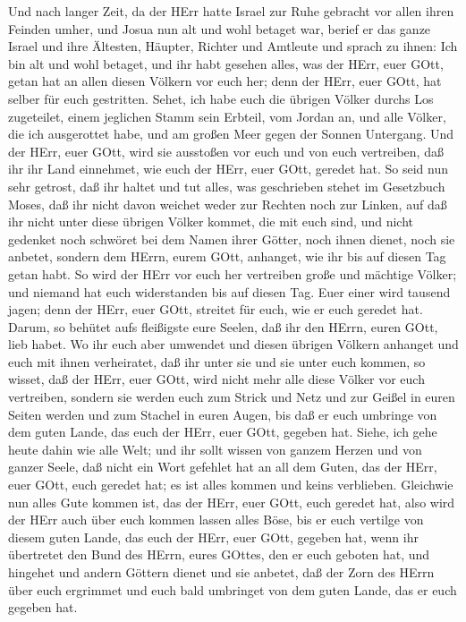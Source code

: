  Und nach langer Zeit, da der HErr hatte Israel zur Ruhe
gebracht vor allen ihren Feinden umher, und Josua nun alt und wohl
betaget war,  berief er das ganze Israel und ihre Ältesten,
Häupter, Richter und Amtleute und sprach zu ihnen: Ich bin alt und wohl
betaget,  und ihr habt gesehen alles, was der HErr, euer
GOtt, getan hat an allen diesen Völkern vor euch her; denn der HErr,
euer GOtt, hat selber für euch gestritten.  Sehet, ich habe
euch die übrigen Völker durchs Los zugeteilet, einem jeglichen Stamm
sein Erbteil, vom Jordan an, und alle Völker, die ich ausgerottet habe,
und am großen Meer gegen der Sonnen Untergang.  Und der
HErr, euer GOtt, wird sie ausstoßen vor euch und von euch vertreiben,
daß ihr ihr Land einnehmet, wie euch der HErr, euer GOtt, geredet hat.
 So seid nun sehr getrost, daß ihr haltet und tut alles, was
geschrieben stehet im Gesetzbuch Moses, daß ihr nicht davon weichet
weder zur Rechten noch zur Linken,  auf daß ihr nicht unter
diese übrigen Völker kommet, die mit euch sind, und nicht gedenket noch
schwöret bei dem Namen ihrer Götter, noch ihnen dienet, noch sie
anbetet,  sondern dem HErrn, eurem GOtt, anhanget, wie ihr
bis auf diesen Tag getan habt.  So wird der HErr vor euch
her vertreiben große und mächtige Völker; und niemand hat euch
widerstanden bis auf diesen Tag.  Euer einer wird tausend
jagen; denn der HErr, euer GOtt, streitet für euch, wie er euch geredet
hat.  Darum, so behütet aufs fleißigste eure Seelen, daß
ihr den HErrn, euren GOtt, lieb habet.  Wo ihr euch aber
umwendet und diesen übrigen Völkern anhanget und euch mit ihnen
verheiratet, daß ihr unter sie und sie unter euch kommen, 
so wisset, daß der HErr, euer GOtt, wird nicht mehr alle diese Völker
vor euch vertreiben, sondern sie werden euch zum Strick und Netz und zur
Geißel in euren Seiten werden und zum Stachel in euren Augen, bis daß er
euch umbringe von dem guten Lande, das euch der HErr, euer GOtt, gegeben
hat.  Siehe, ich gehe heute dahin wie alle Welt; und ihr
sollt wissen von ganzem Herzen und von ganzer Seele, daß nicht ein Wort
gefehlet hat an all dem Guten, das der HErr, euer GOtt, euch geredet
hat; es ist alles kommen und keins verblieben.  Gleichwie
nun alles Gute kommen ist, das der HErr, euer GOtt, euch geredet hat,
also wird der HErr auch über euch kommen lassen alles Böse, bis er euch
vertilge von diesem guten Lande, das euch der HErr, euer GOtt, gegeben
hat,  wenn ihr übertretet den Bund des HErrn, eures GOttes,
den er euch geboten hat, und hingehet und andern Göttern dienet und sie
anbetet, daß der Zorn des HErrn über euch ergrimmet und euch bald
umbringet von dem guten Lande, das er euch gegeben hat.

